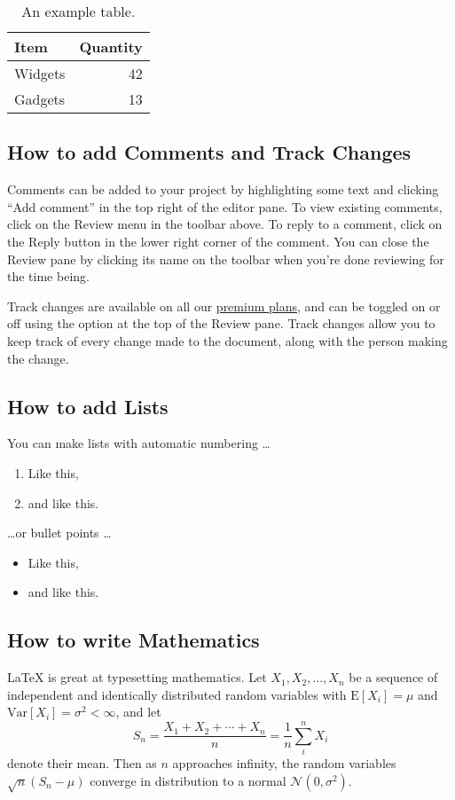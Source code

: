 \documentclass{article}
\begin{document}
\begin{table}
\centering
\begin{tabular}{l|r}
Item & Quantity \\\hline
Widgets & 42 \\
Gadgets & 13
\end{tabular}
\caption{\label{tab:widgets}An example table.}
\end{table}

\subsection{How to add Comments and Track Changes}

Comments can be added to your project by highlighting some text and clicking ``Add comment'' in the top right of the editor pane. To view existing comments, click on the Review menu in the toolbar above. To reply to a comment, click on the Reply button in the lower right corner of the comment. You can close the Review pane by clicking its name on the toolbar when you're done reviewing for the time being.

Track changes are available on all our \href{https://www.overleaf.com/user/subscription/plans}{premium plans}, and can be toggled on or off using the option at the top of the Review pane. Track changes allow you to keep track of every change made to the document, along with the person making the change. 

\subsection{How to add Lists}

You can make lists with automatic numbering \dots

\begin{enumerate}
\item Like this,
\item and like this.
\end{enumerate}
\dots or bullet points \dots
\begin{itemize}
\item Like this,
\item and like this.
\end{itemize}

\subsection{How to write Mathematics}

\LaTeX{} is great at typesetting mathematics. Let $X_1, X_2, \ldots, X_n$ be a sequence of independent and identically distributed random variables with $\text{E}[X_i] = \mu$ and $\text{Var}[X_i] = \sigma^2 < \infty$, and let
\[S_n = \frac{X_1 + X_2 + \cdots + X_n}{n}
      = \frac{1}{n}\sum_{i}^{n} X_i\]
denote their mean. Then as $n$ approaches infinity, the random variables $\sqrt{n}(S_n - \mu)$ converge in distribution to a normal $\mathcal{N}(0, \sigma^2)$.
\end{document}
